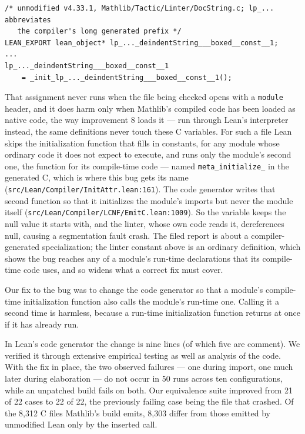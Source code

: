 \documentclass{article}
\newcommand{\Lean}{Lean\xspace}      %
\newcommand{\mathlib}{Mathlib\xspace}
\begin{document}
\begin{small}
\begin{verbatim}
/* unmodified v4.33.1, Mathlib/Tactic/Linter/DocString.c; lp_... abbreviates
   the compiler's long generated prefix */
LEAN_EXPORT lean_object* lp_..._deindentString___boxed__const__1;
...
lp_..._deindentString___boxed__const__1
    = _init_lp_..._deindentString___boxed__const__1();
\end{verbatim}
\end{small}

\noindent That assignment never runs when the file being checked opens with a \texttt{module} header, and it does harm only when \mathlib's compiled code has been loaded as native code, the way improvement 8 loads it --- run through \Lean's interpreter instead, the same definitions never touch these C variables. For such a file \Lean skips the initialization function that fills in constants, for any module whose ordinary code it does not expect to execute, and runs only the module's second one, the function for its compile-time code --- named \texttt{meta\_initialize\_} in the generated C, which is where this bug gets its name (\texttt{src/Lean/Compiler/InitAttr.lean:161}). The code generator writes that second function so that it initializes the module's imports but never the module itself (\texttt{src/Lean/Compiler/\allowbreak LCNF/EmitC.lean:1009}). So the variable keeps the null value it starts with, and the linter, whose own code reads it, dereferences null, causing a segmentation fault crash. The filed report is about a compiler-generated specialization; the linter constant above is an ordinary definition, which shows the bug reaches any of a module's run-time declarations that its compile-time code uses, and so widens what a correct fix must cover.

Our fix to the bug was to change the code generator so that a module's compile-time initialization function also calls the module's run-time one. Calling it a second time is harmless, because a run-time initialization function returns at once if it has already run.

In \Lean's code generator the change is nine lines (of which five are comment). We verified it through extensive empirical testing as well as analysis of the code. With the fix in place, the two observed failures --- one during import, one much later during elaboration --- do not occur in 50 runs across ten configurations, while an unpatched build fails on both. Our equivalence suite improved from 21 of 22 cases to 22 of 22, the previously failing case being the file that crashed. Of the 8{,}312 C files \mathlib's build emits, 8{,}303 differ from those emitted by unmodified \Lean only by the inserted call.
\end{document}
